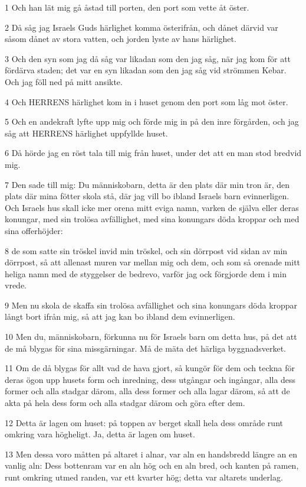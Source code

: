 \par 1 Och han lät mig gå åstad till porten, den port som vette åt öster.
\par 2 Då såg jag Israels Guds härlighet komma österifrån, och dånet därvid var såsom dånet av stora vatten, och jorden lyste av hans härlighet.
\par 3 Och den syn som jag då såg var likadan som den jag såg, när jag kom för att fördärva staden; det var en syn likadan som den jag såg vid strömmen Kebar. Och jag föll ned på mitt ansikte.
\par 4 Och HERRENS härlighet kom in i huset genom den port som låg mot öster.
\par 5 Och en andekraft lyfte upp mig och förde mig in på den inre förgården, och jag såg att HERRENS härlighet uppfyllde huset.
\par 6 Då hörde jag en röst tala till mig från huset, under det att en man stod bredvid mig.
\par 7 Den sade till mig: Du människobarn, detta är den plats där min tron är, den plats där mina fötter skola stå, där jag vill bo ibland Israels barn evinnerligen. Och Israels hus skall icke mer orena mitt eviga namn, varken de själva eller deras konungar, med sin trolösa avfällighet, med sina konungars döda kroppar och med sina offerhöjder:
\par 8 de som satte sin tröskel invid min tröskel, och sin dörrpost vid sidan av min dörrpost, så att allenast muren var mellan mig och dem, och som så orenade mitt heliga namn med de styggelser de bedrevo, varför jag ock förgjorde dem i min vrede.
\par 9 Men nu skola de skaffa sin trolösa avfällighet och sina konungars döda kroppar långt bort ifrån mig, så att jag kan bo ibland dem evinnerligen.
\par 10 Men du, människobarn, förkunna nu för Israels barn om detta hus, på det att de må blygas för sina missgärningar. Må de mäta det härliga byggnadsverket.
\par 11 Om de då blygas för allt vad de hava gjort, så kungör för dem och teckna för deras ögon upp husets form och inredning, dess utgångar och ingångar, alla dess former och alla stadgar därom, alla dess former och alla lagar därom, så att de akta på hela dess form och alla stadgar därom och göra efter dem.
\par 12 Detta är lagen om huset: på toppen av berget skall hela dess område runt omkring vara högheligt. Ja, detta är lagen om huset.
\par 13 Men dessa voro måtten på altaret i alnar, var aln en handsbredd längre an en vanlig aln: Dess bottenram var en aln hög och en aln bred, och kanten på ramen, runt omkring utmed randen, var ett kvarter hög; detta var altarets underlag.
